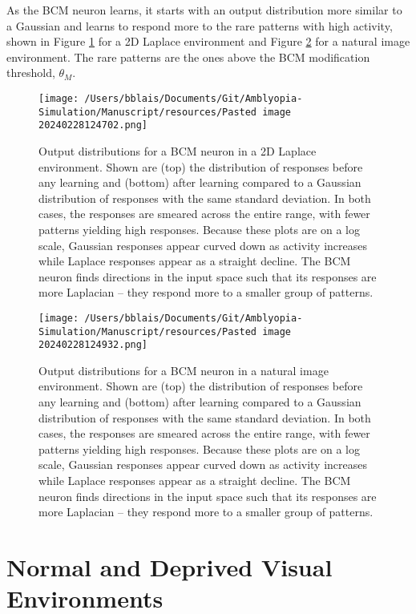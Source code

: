 \documentclass[
]{article}
\begin{document}
As the BCM neuron learns, it starts with an output distribution more
similar to a Gaussian and learns to respond more to the rare patterns
with high activity, shown in Figure \ref{fig:2D_BCM_Laplace} for a 2D
Laplace environment and Figure \ref{fig:BCM_Natural_Image} for a natural
image environment. The rare patterns are the ones above the BCM
modification threshold, \(\theta_M\).

\begin{figure}
\centering
\texttt{[image: /Users/bblais/Documents/Git/Amblyopia-Simulation/Manuscript/resources/Pasted image 20240228124702.png]}
\caption{Output distributions for a BCM neuron in a 2D Laplace
environment. Shown are (top) the distribution of responses before any
learning and (bottom) after learning compared to a Gaussian distribution
of responses with the same standard deviation. In both cases, the
responses are smeared across the entire range, with fewer patterns
yielding high responses. Because these plots are on a log scale,
Gaussian responses appear curved down as activity increases while
Laplace responses appear as a straight decline. The BCM neuron finds
directions in the input space such that its responses are more Laplacian
-- they respond more to a smaller group of
patterns.}\label{fig:2D_BCM_Laplace}
\end{figure}

\begin{figure}
\centering
\texttt{[image: /Users/bblais/Documents/Git/Amblyopia-Simulation/Manuscript/resources/Pasted image 20240228124932.png]}
\caption{Output distributions for a BCM neuron in a natural image
environment. Shown are (top) the distribution of responses before any
learning and (bottom) after learning compared to a Gaussian distribution
of responses with the same standard deviation. In both cases, the
responses are smeared across the entire range, with fewer patterns
yielding high responses. Because these plots are on a log scale,
Gaussian responses appear curved down as activity increases while
Laplace responses appear as a straight decline. The BCM neuron finds
directions in the input space such that its responses are more Laplacian
-- they respond more to a smaller group of
patterns.}\label{fig:BCM_Natural_Image}
\end{figure}

\section{Normal and Deprived Visual
Environments}\label{sec:normal-and-deprived-visual-environments}
\end{document}
